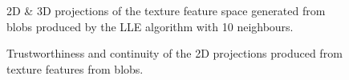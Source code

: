 \begin{figure}[H]
	\centering
	\caption{2D \& 3D projections of the texture feature space generated from blobs produced by the LLE algorithm with 10 neighbours.}\label{fig:texture_LLE_mapping}
\end{figure}
\clearpage


\clearpage
\begin{figure}[H]
	\centering
	\caption{Trustworthiness and continuity of the 2D projections produced from texture features from blobs.}\label{fig:TC_2d_texture}
\end{figure}


